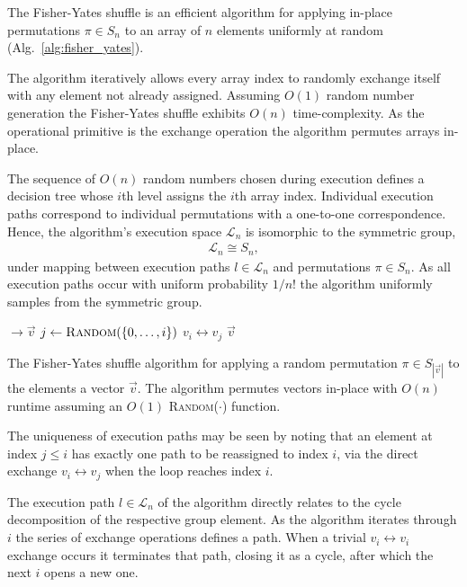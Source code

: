 The Fisher-Yates shuffle \cite{FisherYates53} is an efficient algorithm for applying in-place permutations $\pi\in S_n$ to an array of $n$ elements uniformly at random (Alg.~\ref{alg:fisher_yates}).

The algorithm iteratively allows every array index to randomly exchange itself with any element not already assigned. Assuming $O(1)$ random number generation the Fisher-Yates shuffle exhibits $O(n)$ time-complexity. As the operational primitive is the exchange operation the algorithm permutes arrays in-place.

The sequence of $O(n)$ random numbers chosen during execution defines a decision tree whose $i$th level assigns the $i$th array index. Individual execution paths correspond to individual permutations with a one-to-one correspondence. Hence, the algorithm's execution space $\mathcal{L}_n$ is isomorphic to the symmetric group,
\begin{align}
	\mathcal{L}_n \cong S_n,
\end{align}
under mapping between execution paths \mbox{$l\in\mathcal{L}_n$} and permutations \mbox{$\pi\in S_n$}. As all execution paths occur with uniform probability $1/n!$ the algorithm uniformly samples from the symmetric group.

\begin{algorithm}[H]
	\begin{algorithmic}
		 $\to \vec{v}$ 
		 
		\State $j \gets \textsc{Random}(\{0,\dots,i\})$ 
		\State $v_i\leftrightarrow v_j$ 
		\EndFor
		\State \Return $\vec{v}$
		\EndFunction
	\end{algorithmic}
	\caption{\cite{FisherYates53} The Fisher-Yates shuffle algorithm for applying a random permutation $\pi\in S_{|\vec{v}|}$ to the elements a vector $\vec{v}$. The algorithm permutes  vectors in-place with $O(n)$ runtime assuming an $O(1)$ \textsc{Random}($\cdot$) function.}\label{alg:fisher_yates}
\end{algorithm}

The uniqueness of execution paths may be seen by noting that an element at index $j\leq i$ has  exactly one path to be reassigned to index $i$, via the direct exchange $v_i\leftrightarrow v_j$ when the loop reaches index $i$.

The execution path $l\in\mathcal{L}_n$ of the algorithm directly relates to the cycle decomposition of the respective group element. As the algorithm iterates through $i$ the series of exchange operations defines a path. When a trivial $v_i\leftrightarrow v_i$ exchange occurs it terminates that path, closing it as a cycle, after which the next $i$ opens a new one.

